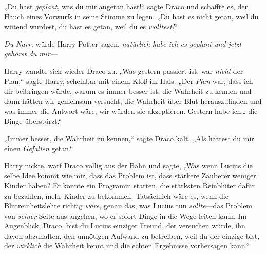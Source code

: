 „Du hast \emph{geplant}, was du mir angetan hast!“ sagte Draco und schaffte es, den Hauch eines Vorwurfs in seine Stimme zu legen. „Du hast es nicht getan, weil du wütend wurdest, du hast es getan, weil du es \emph{wolltest!}“

\emph{Du Narr,} würde Harry Potter sagen, \emph{natürlich habe ich es geplant und jetzt gehörst du mir—}

Harry wandte sich wieder Draco zu. „Was gestern passiert ist, war \emph{nicht} der Plan,“ sagte Harry, scheinbar mit einem Kloß im Hals. „Der \emph{Plan} war, dass ich dir beibringen würde, warum es immer besser ist, die Wahrheit zu kennen und dann hätten wir gemeinsam versucht, die Wahrheit über Blut herauszufinden und was immer die Antwort wäre, wir würden sie akzeptieren. Gestern habe ich… die Dinge überstürzt.“

„Immer besser, die Wahrheit zu kennen,“ sagte Draco kalt. „Als hättest du mir einen \emph{Gefallen} getan.“

Harry nickte, warf Draco völlig aus der Bahn und sagte, „Was wenn Lucius die selbe Idee kommt wie mir, dass das Problem ist, dass stärkere Zauberer weniger Kinder haben? Er könnte ein Programm starten, die stärksten Reinblüter dafür zu bezahlen, mehr Kinder zu bekommen. Tatsächlich wäre es, wenn die Blutreinheitslehre richtig \emph{wäre}, genau das, was Lucius tun \emph{sollte}—das Problem von \emph{seiner} Seite aus angehen, wo er sofort Dinge in die Wege leiten kann. Im Augenblick, Draco, bist du Lucius einziger Freund, der versuchen würde, ihn davon abzuhalten, den unnötigen Aufwand zu betreiben, weil du der einzige bist, der \emph{wirklich} die Wahrheit kennt und die echten Ergebnisse vorhersagen kann.“

